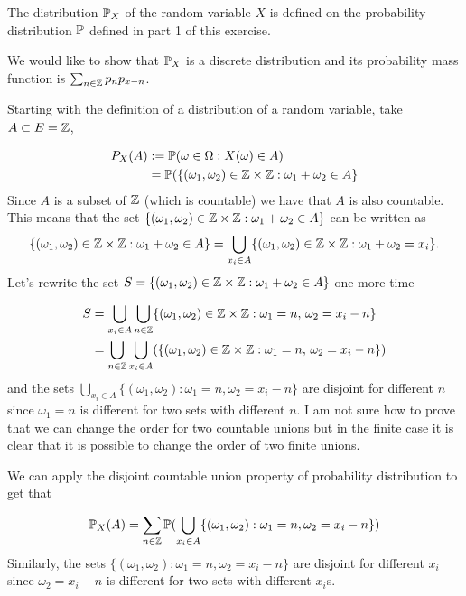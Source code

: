 

The distribution $ \P_{X} $ of the random variable $ X$ is defined on the probability distribution
$ \P$ defined in part 1 of this exercise.

We would like to show that $ \P_{X} $ is a discrete distribution and its probability mass function is 
$ \sum_{n \in \Z} p_{n} p_{x-n}  $.

Starting with the definition of a distribution of a random variable, take $ A \subset E = \Z$,

\begin{align*}
    P_{X} (A) &:= \P(\omega \in \Omega: X(\omega) \in A)\\ 
	      &= \P( \{ (\omega_1, \omega_2) \in \Z \times \Z: \omega_1+ \omega_2 \in A \} \\
\end{align*}
Since $ A $ is a subset of $ \Z$ (which is countable) we have that $ A$ is also countable. This
means that the set $ \{ (\omega_1, \omega_2) \in \Z \times \Z: \omega_1+ \omega_2 \in A \} $ 
can be written as 
\[
    \{ (\omega_1, \omega_2) \in \Z \times \Z: \omega_1+ \omega_2 \in A \}  = \bigcup_{x_{i} \in A}
    \{ (\omega_1, \omega_2) \in \Z \times \Z: \omega_1+ \omega_2 = x_{i}  \} 
.\] 
Let's rewrite the set $ S = \{ (\omega_1, \omega_2) \in \Z \times \Z: \omega_1+ \omega_2 \in A \} $ one more time

\begin{align*}
   S &=  \bigcup_{x_{i}\in A}  \bigcup_{n \in \Z}  \{ (\omega_1, \omega_2) \in \Z \times \Z: \omega_1 = n, \, \omega_2 =
	 x_{i} -n \} \\
     &= \bigcup_{n \in \Z} \bigcup_{x_{i} \in A } (\{ (\omega_1, \omega_2) \in \Z \times \Z: \omega_1 = n, \, \omega_2 =
	 x_{i} -n \}) \\
\end{align*}
and the sets $ \bigcup_{x_{i} \in A} \{ (\omega_{1} , \omega_2): \omega_1= n, \omega_2 = x_{i} -n
\}$ are disjoint for different $ n$ since $ \omega_{1} = n $ is different
    for two sets with different $ n $. I am not sure how to prove that 
    we can change the order for two countable unions but in the finite case it is clear
    that it is possible to change the order of two finite unions.


We can apply the disjoint countable union property of probability distribution to get that 


\begin{align*}
    \P_{X}(A) &= \sum_{n \in \Z} \P( \bigcup_{x_{i} \in A} \{ (\omega_1, \omega_2): \omega_1 = n,
    \omega_2 = x_{i} -n \} )\\
\end{align*}
Similarly, the sets $ \{   (\omega_1, \omega_2): \omega_1 = n,
    \omega_2 = x_{i} -n\} $ are disjoint for different $ x_{i} $ since $ \omega_{2} = x_{i} -n $ is different
    for two sets with different $ x_{i} $s.

